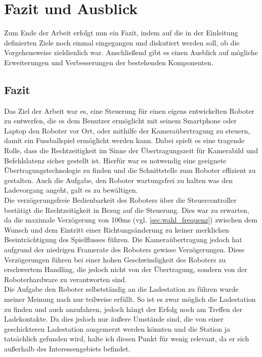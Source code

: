 \chapter{Fazit und Ausblick}
\label{ch:fazit}

Zum Ende der Arbeit erfolgt nun ein Fazit, indem auf die in der Einleitung definierten Ziele noch einmal eingegangen und diskutiert werden soll, ob die Vorgehensweise zieldienlich war. Anschließend gibt es einen Ausblick auf mögliche Erweiterungen und Verbesserungen der bestehenden Komponenten.

\section{Fazit}
Das Ziel der Arbeit war es, eine Steuerung für einen eigens entwickelten Roboter zu entwerfen, die es dem Benutzer ermöglicht mit seinem Smartphone oder Laptop den Roboter vor Ort, oder mithilfe der Kameraübertragung zu steuern, damit ein Fussballspiel ermöglicht werden kann. Dabei spielt es eine tragende Rolle, dass die Rechtzeitigkeit im Sinne der Übertragungszeit für Kamerabild und Befehlslatenz sicher gestellt ist. Hierfür war es notwendig eine geeignete Übertragungstechnologie zu finden und die Schnittstelle zum Roboter effizient zu gestalten. Auch die Aufgabe, den Roboter wartungsfrei zu halten was den Ladevorgang angeht, galt es zu bewältigen. \\
Die verzögerungsfreie Bedienbarkeit des Roboters über die Steuercontroller bestätigt die Rechtzeitigkeit in Bezug auf die Steuerung. Dies war zu erwarten, da die maximale Verzögerung von 100ms (vgl. \ref{sec:wahl_frequenz}) zwischen dem Wunsch und dem Eintritt einer Richtungsänderung zu keiner merklichen Beeinträchtigung des Spielflusses führen. Die Kameraübertragung jedoch hat aufgrund der niedrigen Framerate des Roboters gewisse Verzögerungen. Diese Verzögerungen führen bei einer hohen Geschwindigkeit des Roboters zu erschwertem Handling, die jedoch nicht von der Übertragung, sondern von der Roboterhardware zu verantworten sind. \\
Die Aufgabe den Roboter selbstständig an die Ladestation zu führen wurde meiner Meinung nach nur teilweise erfüllt. So ist es zwar möglich die Ladestation zu finden und auch anzufahren, jedoch hängt der Erfolg noch am Treffen der Ladekontakte. Da dies jedoch nur äußere Umstände sind, die von einer geschickteren Ladestation ausgemerzt werden könnten und die Station ja tatsächlich gefunden wird, halte ich diesen Punkt für wenig relevant, da er sich außerhalb des Interessengebiets befindet. \\
